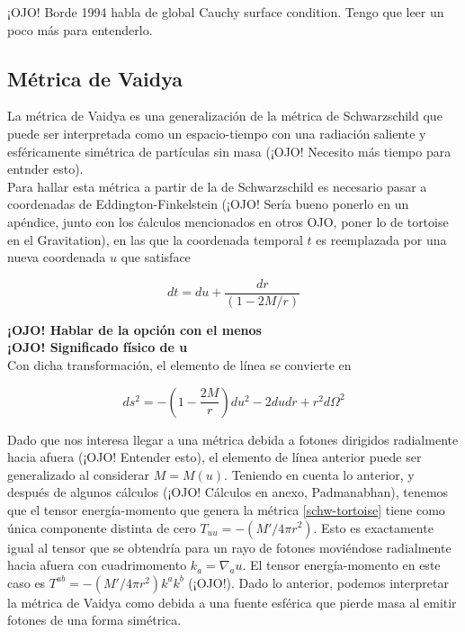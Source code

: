 \documentclass[prb,aps,preprintnumbers,amsmath,amssymb]{article}
\numberwithin{equation}{section}
\begin{document}
¡OJO! Borde 1994 habla de global Cauchy surface condition. Tengo que leer un poco más para entenderlo.


\subsection{Métrica de Vaidya}

La métrica de Vaidya \cite{vaidya} es una generalización de la métrica de Schwarzschild que puede ser interpretada como un espacio-tiempo con una radiación saliente y esféricamente simétrica de partículas sin masa (¡OJO! Necesito más tiempo para entnder esto).\\

Para hallar esta métrica a partir de la de Schwarzschild es necesario pasar a coordenadas de Eddington-Finkelstein (¡OJO! Sería bueno ponerlo en un apéndice, junto con los ćalculos mencionados en otros OJO, poner lo de tortoise en el Gravitation), en las que la coordenada temporal $t$ es reemplazada por una nueva coordenada $u$ que satisface

\begin{equation}
dt = du + \frac{dr}{(1 - 2M/r)}
\end{equation}

\textbf{¡OJO! Hablar de la opción con el menos}\\

\textbf{¡OJO! Significado físico de u}\\

Con dicha transformación, el elemento de línea se convierte en 

\begin{equation}
\label{schw-tortoise}
ds^2 = - \left(1- \frac{2M}{r}\right)du^2 - 2dudr + r^2d\Omega^2
\end{equation}

Dado que nos interesa llegar a una métrica debida a fotones dirigidos radialmente hacia afuera (¡OJO! Entender esto), el elemento de línea anterior puede ser generalizado al considerar $M = M(u)$. Teniendo en cuenta lo anterior, y después de algunos cálculos (¡OJO! Cálculos en anexo, Padmanabhan), tenemos que el tensor energía-momento que genera la métrica \eqref{schw-tortoise} tiene como única componente distinta de cero $T_{uu} = -(M'/4 \pi r^2)$. Esto es exactamente igual al tensor que se obtendría para un rayo de fotones moviéndose radialmente hacia afuera con cuadrimomento $k_{a} = \nabla_{a}u$. El tensor energía-momento en este caso es $T^{ab} = -(M'/4 \pi r^2)k^{a}k^{b}$ (¡OJO!). Dado lo anterior, podemos interpretar la métrica de Vaidya como debida a una fuente esférica que pierde masa al emitir fotones de una forma simétrica.\\
\end{document}
